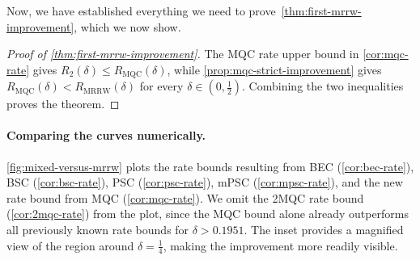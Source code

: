 \documentclass[11pt]{article}
\renewcommand{\leq}{\leqslant}
\theoremstyle{remark}
\newcommand{\MRRW}{R_{\mathrm{MRRW}}}
\newcommand{\MQC}{\mathrm{MQC}}
\begin{document}
Now, we have established everything we need to prove~\cref{thm:first-mrrw-improvement}, which we now show.

\begin{proof}[Proof of \cref{thm:first-mrrw-improvement}]
The MQC rate upper bound in \cref{cor:mqc-rate} gives $R_2(\delta) \leq R_{\MQC}(\delta)$,
while \cref{prop:mqc-strict-improvement} gives $R_{\MQC}(\delta) < \MRRW(\delta)$ for every $\delta \in (0,\frac{1}{2})$. Combining the two inequalities proves the theorem.\qedhere
\end{proof}

\paragraph{Comparing the curves numerically.}
\cref{fig:mixed-versus-mrrw} plots the rate bounds resulting from BEC (\cref{cor:bec-rate}), BSC (\cref{cor:bsc-rate}), PSC (\cref{cor:psc-rate}), mPSC (\cref{cor:mpsc-rate}), and the new rate bound from MQC (\cref{cor:mqc-rate}). We omit the 2MQC rate bound (\cref{cor:2mqc-rate}) from the plot, since the MQC bound alone already outperforms all previously known rate bounds for $\delta > 0.1951$. The inset provides a magnified view of the region around $\delta = \frac{1}{4}$, making the improvement more readily visible.
\end{document}
